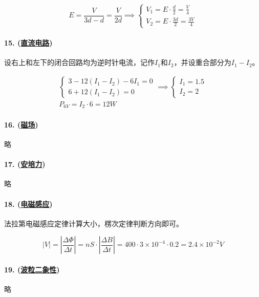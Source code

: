 \begin{equation*}
    E=\frac{V}{3d-d}=\frac{V}{2d}\implies
    \begin{cases}
        V_1=E\cdot\frac{d}{2}=\frac{V}{4}\\
        V_2=E\cdot\frac{3d}{2}=\frac{3V}{4}
    \end{cases}
\end{equation*}

\paragraph{15. (\hyperref[subsec:直流电路]{直流电路})} 设右上和左下的闭合回路均为逆时针电流，记作$I_1$和$I_2$，并设重合部分为$I_1-I_2$。

\begin{gather*}
    \begin{cases}
        3-12(I_1-I_2)-6I_1=0\\
        6+12(I_1-I_2)=0
    \end{cases}\implies
    \begin{cases}
        I_1=1.5\\
        I_2=2
    \end{cases}\\
    P_{6V}=I_2\cdot6=12W
\end{gather*}

\paragraph{16. (\hyperref[subsec:磁场]{磁场})} 略
\paragraph{17. (\hyperref[subsec:安培力]{安培力})} 略
\paragraph{18. (\hyperref[subsec:电磁感应]{电磁感应})} 法拉第电磁感应定律计算大小，楞次定律判断方向即可。

\begin{equation*}
    |V|=\left|\frac{\Delta\Phi}{\Delta t}\right|
    =nS\cdot\left|\frac{\Delta B}{\Delta t}\right|
    =400\cdot3\times10^{-4}\cdot0.2=2.4\times10^{-2}V
\end{equation*}

\paragraph{19. (\hyperref[sec:波粒二象性]{波粒二象性})} 略
